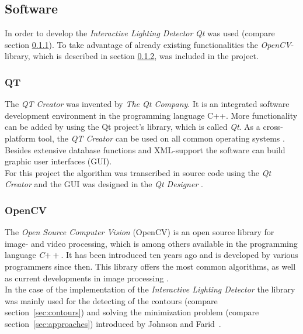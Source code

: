 \subsection{Software} \label{sec:Software}
In order to develop the \textit{Interactive Lighting Detector} \textit{Qt} was used (compare section \ref{sec:qt}). To take advantage of already existing functionalities the \textit{OpenCV}-library, which is described in section \ref{sec:opencv}, was included in the project.


\subsubsection{QT} \label{sec:qt}
The \textit{QT Creator} was invented by \textit{The Qt Company}. It is an integrated software development environment in the programming language C++. More functionality can be added by using the Qt project's library, which is called \textit{Qt}.
As a cross-platform tool, the \textit{QT Creator} can be used on all common operating systems \cite{QTCreator}. \\ Besides extensive database functions and XML-support the software can build graphic user interfaces (GUI).\\
For this project the algorithm was transcribed in source code using the \textit{Qt Creator} and the GUI was designed in the \textit{Qt Designer} \cite{website:QtDesigner}.




\subsubsection{OpenCV} \label{sec:opencv}
The \textit{Open Source Computer Vision} (OpenCV) is an open source library for image- and video processing, which is among others available in the programming language \textit{C}$++$. It has been introduced ten years ago and is developed by various programmers since then. This library offers the most common algorithms, as well as current developments in image processing \cite{article:OpenCV}.\\
In the case of the implementation of the \textit{Interactive Lighting Detector} the library was mainly used for the detecting of the contours (compare section~\ref{sec:contours}) and solving the minimization problem (compare section~\ref{sec:approaches}) introduced by Johnson and Farid~\cite{Johnson}.


